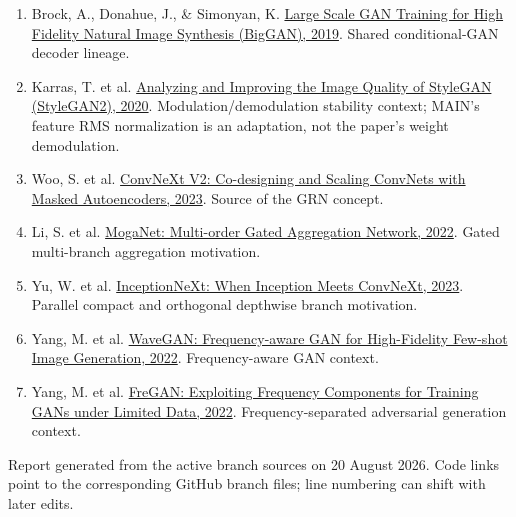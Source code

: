 \documentclass[10pt,a4paper]{article}
\newcommand{\paper}[2]{\href{#1}{#2}}
\begin{document}
\begin{enumerate}[leftmargin=1.6em,itemsep=3pt]
  \item Brock, A., Donahue, J., \& Simonyan, K. \paper{https://arxiv.org/abs/1809.11096}{Large Scale GAN Training for High Fidelity Natural Image Synthesis (BigGAN), 2019}.  Shared conditional-GAN decoder lineage.
  \item Karras, T. et al. \paper{https://arxiv.org/abs/1912.04958}{Analyzing and Improving the Image Quality of StyleGAN (StyleGAN2), 2020}.  Modulation/demodulation stability context; MAIN's feature RMS normalization is an adaptation, not the paper's weight demodulation.
  \item Woo, S. et al. \paper{https://arxiv.org/abs/2301.00808}{ConvNeXt V2: Co-designing and Scaling ConvNets with Masked Autoencoders, 2023}.  Source of the GRN concept.
  \item Li, S. et al. \paper{https://arxiv.org/abs/2211.03295}{MogaNet: Multi-order Gated Aggregation Network, 2022}.  Gated multi-branch aggregation motivation.
  \item Yu, W. et al. \paper{https://arxiv.org/abs/2303.16900}{InceptionNeXt: When Inception Meets ConvNeXt, 2023}.  Parallel compact and orthogonal depthwise branch motivation.
  \item Yang, M. et al. \paper{https://arxiv.org/abs/2207.07288}{WaveGAN: Frequency-aware GAN for High-Fidelity Few-shot Image Generation, 2022}.  Frequency-aware GAN context.
  \item Yang, M. et al. \paper{https://arxiv.org/abs/2210.05461}{FreGAN: Exploiting Frequency Components for Training GANs under Limited Data, 2022}.  Frequency-separated adversarial generation context.
\end{enumerate}

\vfill
\begin{center}
\footnotesize\color{gray!70!black}
Report generated from the active branch sources on 20 August 2026.  Code links point to the corresponding GitHub branch files; line numbering can shift with later edits.
\end{center}
\end{document}

